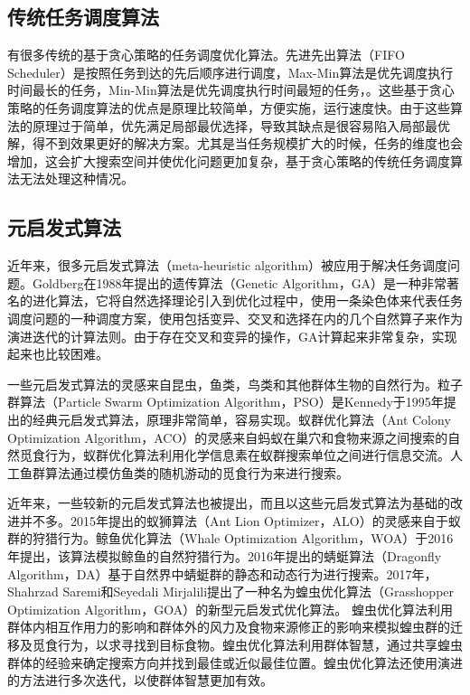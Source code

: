 \subsection{传统任务调度算法}

有很多传统的基于贪心策略的任务调度优化算法\cite{乔楠楠2017一种面向网络边缘任务调度问题的多方向粒子群优化算法}。先进先出算法（FIFO Scheduler）是按照任务到达的先后顺序进行调度\cite{zaharia2009job}，Max-Min算法是优先调度执行时间最长的任务，Min-Min算法是优先调度执行时间最短的任务，\cite{tabak2014improving,杜玉霞2010Min}。这些基于贪心策略的任务调度算法的优点是原理比较简单，方便实施，运行速度快。由于这些算法的原理过于简单，优先满足局部最优选择，导致其缺点是很容易陷入局部最优解，得不到效果更好的解决方案。尤其是当任务规模扩大的时候，任务的维度也会增加，这会扩大搜索空间并使优化问题更加复杂，基于贪心策略的传统任务调度算法无法处理这种情况。

\subsection{元启发式算法}

近年来，很多元启发式算法（meta-heuristic algorithm）被应用于解决任务调度问题\cite{al2015cloudlet,刘运2015基于高斯变异的人工萤火虫算法在云计算资源调度中的研究}。Goldberg在1988年提出的遗传算法（Genetic Algorithm，GA）是一种非常著名的进化算法，它将自然选择理论引入到优化过程中，使用一条染色体来代表任务调度问题的一种调度方案，使用包括变异、交叉和选择在内的几个自然算子来作为演进迭代的计算法则\cite{fonseca1995overview,whitley1994genetic}。由于存在交叉和变异的操作，GA计算起来非常复杂，实现起来也比较困难。

一些元启发式算法的灵感来自昆虫，鱼类，鸟类和其他群体生物的自然行为。粒子群算法（Particle Swarm Optimization Algorithm，PSO）是Kennedy于1995年提出的经典元启发式算法，原理非常简单，容易实现\cite{kennedy1995particle,liao2007discrete,krishnasamy2013task}。蚁群优化算法（Ant Colony Optimization Algorithm，ACO）的灵感来自蚂蚁在巢穴和食物来源之间搜索的自然觅食行为，蚁群优化算法利用化学信息素在蚁群搜索单位之间进行信息交流\cite{dorigo1997ant,dorigo1999ant,Hao2018Network}。人工鱼群算法通过模仿鱼类的随机游动的觅食行为来进行搜索\cite{桓自强2014aafsa}。

近年来，一些较新的元启发式算法也被提出，而且以这些元启发式算法为基础的改进并不多。2015年提出的蚁狮算法（Ant Lion Optimizer，ALO）的灵感来自于蚁群的狩猎行为\cite{mirjalili2015ant}。鲸鱼优化算法（Whale Optimization Algorithm，WOA）于2016年提出，该算法模拟鲸鱼的自然狩猎行为\cite{mirjalili2016whale}。2016年提出的蜻蜓算法（Dragonfly Algorithm，DA）基于自然界中蜻蜓群的静态和动态行为进行搜索\cite{mirjalili2016dragonfly}。2017年，Shahrzad Saremi和Seyedali Mirjalili提出了一种名为蝗虫优化算法（Grasshopper Optimization Algorithm，GOA）的新型元启发式优化算法。 蝗虫优化算法利用群体内相互作用力的影响和群体外的风力及食物来源修正的影响来模拟蝗虫群的迁移及觅食行为，以求寻找到目标食物\cite{saremi2017grasshopper}。蝗虫优化算法利用群体智慧，通过共享蝗虫群体的经验来确定搜索方向并找到最佳或近似最佳位置。蝗虫优化算法还使用演进的方法进行多次迭代，以使群体智慧更加有效。

